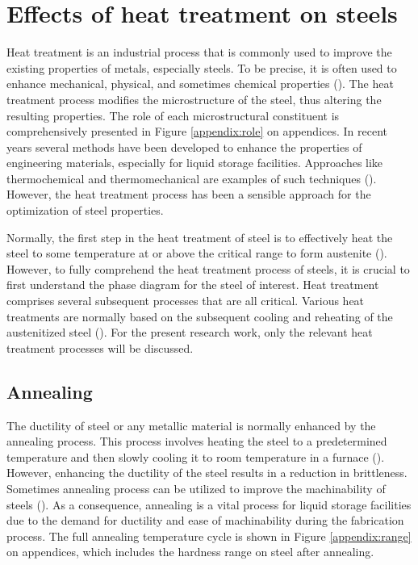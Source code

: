 \section{Effects of heat treatment on steels}
\label{ch3:anchor:section:treatment}
Heat treatment is an industrial process that is commonly used to improve the existing properties of metals, especially steels. To be precise, it is often used to enhance mechanical, physical, and sometimes chemical properties (\cite{mampuya2021effect}). The heat treatment process modifies the microstructure of the steel, thus altering the resulting properties. The role of each microstructural constituent is comprehensively presented in Figure \ref{appendix:role} on appendices. In recent years several methods have been developed to enhance the properties of engineering materials, especially for liquid storage facilities. Approaches like thermochemical and thermomechanical are examples of such techniques (\cite{singh2020applied}). However, the heat treatment process has been a sensible approach for the optimization of steel properties.

Normally, the first step in the heat treatment of steel is to effectively heat the steel to some temperature at or above the critical range to form austenite (\cite{mampuya2021effect}). However, to fully comprehend the heat treatment process of steels, it is crucial to first understand the phase diagram for the steel of interest. Heat treatment comprises several subsequent processes that are all critical. Various heat treatments are normally based on the subsequent cooling and reheating of the austenitized steel (\cite{singh2020applied}).  For the present research work, only the relevant heat treatment processes will be discussed.

\subsection{Annealing}
The ductility of steel or any metallic material is normally enhanced by the annealing process. This process involves heating the steel to a predetermined temperature and then slowly cooling it to room temperature in a furnace (\cite{singh2020applied}). However, enhancing the ductility of the steel results in a reduction in brittleness. Sometimes annealing process can be utilized to improve the machinability of steels (\cite{nikkhah2019improved}). As a consequence, annealing is a vital process for liquid storage facilities due to the demand for ductility and ease of machinability during the fabrication process. The full annealing temperature cycle is shown in Figure \ref{appendix:range} on appendices, which includes the hardness range on steel after annealing. 

